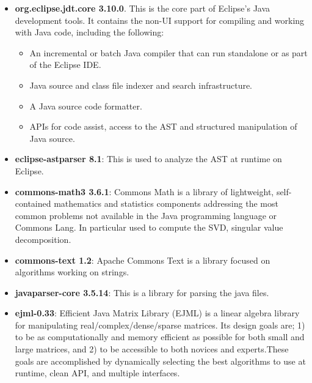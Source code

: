 \begin{itemize}
\item \textbf{org.eclipse.jdt.core 3.10.0}. This is the core part of Eclipse's Java development tools. It contains the non-UI support for compiling and working with Java code, including the following:
	\begin{itemize}
	\item An incremental or batch Java compiler that can run standalone or as part of the Eclipse IDE.
	\item Java source and class file indexer and search infrastructure.
	\item A Java source code formatter.
	\item APIs for code assist, access to the AST and structured manipulation of Java source.
	\end{itemize}
\item \textbf{eclipse-astparser 8.1}: This is used to analyze the AST at runtime on Eclipse.
\item \textbf{commons-math3 3.6.1}: Commons Math is a library of lightweight, self-contained mathematics and statistics components addressing the most common problems not available in the Java programming language or Commons Lang. 
In particular used to compute the SVD, singular value decomposition.
\item \textbf{commons-text 1.2}: Apache Commons Text is a library focused on algorithms working on strings. 
\item \textbf{javaparser-core 3.5.14}: This is a library for parsing the java files.
\item \textbf{ejml-0.33}: Efficient Java Matrix Library (EJML) is a linear algebra library for manipulating real/complex/dense/sparse matrices. Its design goals are; 1) to be as computationally and memory efficient as possible for both small and large matrices, and 2) to be accessible to both novices and experts.These goals are accomplished by dynamically selecting the best algorithms to use at runtime, clean API, and multiple interfaces.
\end{itemize}

